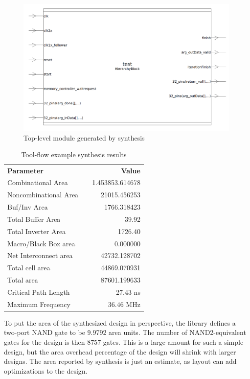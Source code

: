 \begin{figure}[hbpt]
\centering
\includegraphics[width=0.99\textwidth]{../figs/SynthesisCircuit.png}
\caption{\label{fig:synthesiscircuittop}Top-level module generated by synthesis}
\end{figure}
\begin{table}[hbpt]
    \centering
    \begin{tabular}{lcr}
        \textbf{Parameter} && \textbf{Value} \\
        Combinational Area && 1.453853.614678 \\
        Noncombinational Area && 21015.456253 \\
        Buf/Inv Area && 1766.318423 \\
        Total Buffer Area && 39.92 \\
        Total Inverter Area && 1726.40 \\
        Macro/Black Box area && 0.000000 \\
        Net Interconnect area && 42732.128702 \\
        \midrule
        Total cell area && 44869.070931 \\
        Total area && 87601.199633 \\
        \midrule
        Critical Path Length && 27.43 ns \\
        Maximum Frequency && 36.46 MHz\\
        \bottomrule
    \end{tabular}
    \caption{Tool-flow example synthesis results}
    \label{tab:synthreportex}
\end{table}
To put the area of the synthesized design in perspective, the library defines a two-port NAND gate to be 9.9792 area units. The number of NAND2-equivalent gates for the design is then 8757 gates. This is a large amount for such a simple design, but the area overhead percentage of the design will shrink with larger designs. The area reported by synthesis is just an estimate, as layout can add optimizations to the design.

